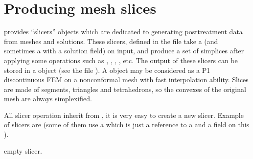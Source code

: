 \documentclass[a4paper,11pt,english]{sphinxmanual}
\begin{document}
\section{Producing mesh slices}
\label{\detokenize{userdoc/export:producing-mesh-slices}}\label{\detokenize{userdoc/export:ud-export-slices}}
 provides “slicers” objects which are dedicated to generating post\sphinxhyphen{}treatment
data from meshes and solutions. These slicers, defined in the file
 take a  (and sometimes a  with a
solution field) on input, and produce a set of simplices after applying some
operations such as , , , , etc. The
output of these slicers can be stored in a  object (see the file
). A  object may be considered as a P1
discontinuous FEM on a non\sphinxhyphen{}conformal mesh with fast interpolation ability. Slices
are made of segments, triangles and tetrahedrons, so the convexes of the original
mesh are always simplexified.

All slicer operation inherit from , it is very easy to create a new
slicer. Example of slicers are (some of them use a  which is just a
reference to a   and a field  on this ).

\begin{fulllineitems}
\label{\detokenize{userdoc/export:_CPPv4N6getfem11slicer_noneEv}}%
\pysigstartmultiline
{}%
\pysigstopmultiline
empty slicer.

\end{fulllineitems}

\end{document}
